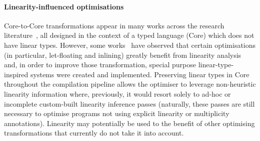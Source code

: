 \documentclass[acmsmall,review,screen]{acmart}
\begin{document}
% 
% 

% 

\paragraph{Linearity-influenced optimisations}

Core-to-Core transformations appear in many works across the research
literature~\cite{cite:let-floating,peytonjones1997a,santos1995compilation,peytonjones2002secrets,baker-finch2004constructed,maurer2017compiling,Breitner2016_1000054251,sergey_vytiniotis_jones_breitner_2017},
all designed in the context of a typed language (Core) which does not have
linear types. However, some works~\cite{cite:let-floating,peytonjones1997a,cite:linearhaskell} have observed that
certain optimisations (in particular, let-floating and inlining) greatly
benefit from linearity analysis and, in order to improve those transformation,
special purpose linear-type-inspired systems were created and implemented.
%
Preserving linear types in Core throughout the compilation pipeline allows the
optimiser to leverage non-heuristic linearity information where, previously, it
would resort solely to ad-hoc or incomplete custom-built linearity inference
passes (naturally, these passes are still necessary to optimise programs not
using explicit linearity or multiplicity annotations). Linearity may
potentially be used to the benefit of other optimising transformations that
currently do not take it into account.

\end{document}
